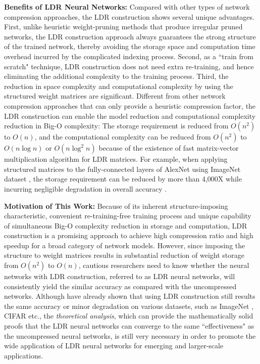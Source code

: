 \documentclass{article}
\begin{document}
\textbf{Benefits of LDR Neural Networks:} Compared with other types of network compression approaches, the LDR construction shows several unique advantages. First, unlike heuristic weight-pruning methods \cite{han2015deep}\cite{gong2014compressing} that produce irregular pruned networks, the LDR construction approach always guarantees the strong structure of the trained network, thereby avoiding the storage space and computation time overhead incurred by the complicated indexing process. Second, as a ``train from scratch" technique, LDR construction does not need extra re-training, and hence eliminating the additional complexity to the training process. Third, the reduction in space complexity and computational complexity by using the structured weight matrices are significant. Different from other network compression approaches that can only provide a heuristic compression factor, the LDR construction can enable the model reduction and computational complexity reduction in Big-O complexity: The storage requirement is reduced from $O(n^2)$ to $O(n)$, and the computational complexity can be reduced from $O(n^2)$ to $O(n\log n)$ or $O(n\log^2 n)$ because of the existence of fast matrix-vector multiplication algorithm \cite{bini2012polynomial}\cite{bini1996polynomial} for LDR matrices. For example, when applying structured matrices to the fully-connected layers of AlexNet using ImageNet dataset \cite{deng2009imagenet}, the storage requirement can be reduced by more than 4,000X while incurring negligible degradation in overall accuracy \cite{cheng2015exploration}.

\textbf{Motivation of This Work:} Because of its inherent structure-imposing characteristic, convenient re-training-free training process and unique capability of simultaneous Big-O complexity reduction in storage and computation, LDR construction is a promising approach to achieve high compression ratio and high speedup for a broad category of network models. However, since imposing the structure to weight matrices results in substantial reduction of weight storage from $O(n^2)$ to $O(n)$, cautious researchers need to know whether the neural networks with LDR construction, referred to as LDR neural networks, will consistently yield the similar accuracy as compared with the uncompressed networks. Although \cite{cheng2015exploration}\cite{sindhwani2015structured} have already shown that using LDR construction still results the same accuracy or minor degradation on various datasets, such as ImageNet \cite{deng2009imagenet}, CIFAR \cite{krizhevsky2009learning} etc., the \emph{theoretical analysis}, which can provide the mathematically solid proofs that the LDR neural networks can converge to the same ``effectiveness" as the uncompressed neural networks, is still very necessary in order to promote the wide application of LDR neural networks for emerging and larger-scale applications.
\end{document}
